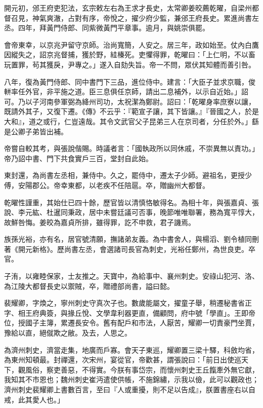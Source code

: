 \begin{pinyinscope}
 開元初，邠王府吏犯法，玄宗敕左右為王求才長史，太常卿姜晈薦乾曜，自梁州都督召見，神氣爽澈，占對有序，帝悅之，擢少府少監，兼邠王府長史。累進尚書左丞。四年，拜黃門侍郎、同紫微黃門平章事。逾月，與姚崇俱罷。



 會帝東幸，以京兆尹留守京師。治尚寬簡，人安之。居三年，政如始至。仗內白鷹因縱失之，詔京兆督捕，獲於野，絓榛死。吏懼得罪，乾曜曰：「上仁明，不以畜玩置罪，茍其獲戾，尹專之。」遂入自劾失旨。帝一不問，眾伏其知體而善引咎。



 八年，復為黃門侍郎、同中書門下三品，進位侍中。建言：「大臣子並求京職，俊軿率任外官，非平施之道。臣三息俱任京師，請出二息補外，以示自近始。」詔可。乃以子河南參軍弼為絳州司功，太祝潔為鄭尉。詔曰：「乾曜身率庶寮以讓，既請外其子，又復下遷。《傳》不云乎：『範宣子讓，其下皆讓。』『晉國之人，於是大和』，道之或行，仁豈遠哉。其令文武官父子昆弟三人在京司者，分任於外。」繇是公卿子弟皆出補。



 帝嘗自較其考，與張說偕賜。時議者言：「國執政所以同休戚，不崇異無以責功。」帝乃詔中書、門下共食實戶三百，堂封自此始。



 東封還，為尚書左丞相，兼侍中。久之，罷侍中，遷太子少師。避祖名，更授少傅，安陽郡公。帝幸東都，以老疾不任陪扈。卒，贈幽州大都督。



 乾曜性謹重，其始仕已四十餘，歷官皆以清慎恪敏得名。為相十年，與張嘉貞、張說、李元紘、杜暹同秉政，居中未嘗廷議可否事，晚節唯唯聯署，務為寬平惇大，故鮮咎悔。姜晈為嘉貞所排，雖得罪，訖不申救，君子譏焉。



 族孫光裕，亦有名，居官號清願，撫諸弟友義。為中書舍人，與楊滔、劉令植同刪著《開元新格》。歷尚書左丞，會選諸司長官為刺史，光裕任鄭州，為世良吏。卒官。



 子洧，以雍睦保家，士友推之。天寶中，為給事中、襄州刺史。安祿山犯河、洛、為江陵大都督長史以禦賊，卒，贈禮部尚書，謚曰懿。



 裴耀卿，字煥之，寧州刺史守真次子也。數歲能屬文，擢童子舉，稍遷秘書省正字、相王府典簽，與掾丘悅、文學韋利器更直，備顧問，府中號「學直」。王即帝位，授國子主簿，累遷長安令。舊有配戶和市法，人厭苦，耀卿一切責豪門坐賈，豫給以直，絕僦欺之敝。及去，人思之。



 為濟州刺史，濟當走集，地廣而戶寡。會天子東巡，耀卿置三梁十驛，科斂均省，為東州知頓最。封禪還，次宋州，宴從官，帝歡甚，謂張說曰：「前日出使巡天下，觀風俗，察吏善惡，不得實。今朕有事岱宗，而懷州刺史王丘餼牽外無它獻，我知其不市恩也；魏州刺史崔沔遣使供帳，不施錦繡，示我以儉，此可以觀政也；濟州刺史裴耀卿上書數百言，至曰『人或重擾，則不足以告成』，朕置書座右以自戒，此其愛人也。」




\end{pinyinscope}
